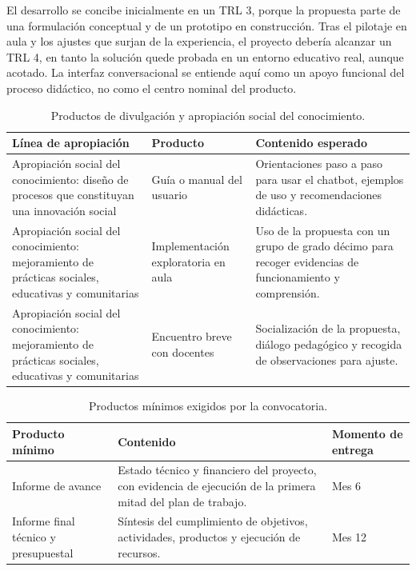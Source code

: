 \documentclass[11pt,spanish,letterpaper,openany]{book}
\begin{document}
El desarrollo se concibe inicialmente en un TRL 3, porque la propuesta parte de una formulación conceptual y de un prototipo en construcción. Tras el pilotaje en aula y los ajustes que surjan de la experiencia, el proyecto debería alcanzar un TRL 4, en tanto la solución quede probada en un entorno educativo real, aunque acotado. La interfaz conversacional se entiende aquí como un apoyo funcional del proceso didáctico, no como el centro nominal del producto.

\begin{table}[H]
\centering
\caption{Productos de divulgación y apropiación social del conocimiento.}
\begin{tabularx}{\textwidth}{>{\raggedright\arraybackslash}p{4.4cm} >{\raggedright\arraybackslash}p{4.2cm} >{\raggedright\arraybackslash}X}
\toprule
Línea de apropiación & Producto & Contenido esperado \\
\midrule
Apropiación social del conocimiento: diseño de procesos que constituyan una innovación social & Guía o manual del usuario & Orientaciones paso a paso para usar el chatbot, ejemplos de uso y recomendaciones didácticas. \\
Apropiación social del conocimiento: mejoramiento de prácticas sociales, educativas y comunitarias & Implementación exploratoria en aula & Uso de la propuesta con un grupo de grado décimo para recoger evidencias de funcionamiento y comprensión. \\
Apropiación social del conocimiento: mejoramiento de prácticas sociales, educativas y comunitarias & Encuentro breve con docentes & Socialización de la propuesta, diálogo pedagógico y recogida de observaciones para ajuste. \\
\bottomrule
\end{tabularx}
\end{table}

\begin{table}[H]
\centering
\caption{Productos mínimos exigidos por la convocatoria.}
\begin{tabularx}{\textwidth}{>{\raggedright\arraybackslash}p{4cm} >{\raggedright\arraybackslash}p{5.2cm} >{\centering\arraybackslash}p{2.3cm}}
\toprule
Producto mínimo & Contenido & Momento de entrega \\
\midrule
Informe de avance & Estado técnico y financiero del proyecto, con evidencia de ejecución de la primera mitad del plan de trabajo. & Mes 6 \\
Informe final técnico y presupuestal & Síntesis del cumplimiento de objetivos, actividades, productos y ejecución de recursos. & Mes 12 \\
\bottomrule
\end{tabularx}
\end{table}
\end{document}
